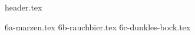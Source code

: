\clearpage
{}
\divisorLine

{header.tex}

\begin{multicols}{2}

{6a-marzen.tex}
{6b-rauchbier.tex}
{6c-dunkles-bock.tex}

\end{multicols}